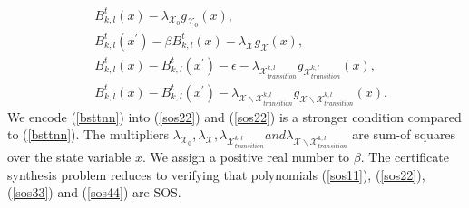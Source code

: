 \documentclass[acmlarge]{acmart}
\begin{document}
\begin{align}
  &B^t_{k, l}(x) - \lambda_{\mathcal{X}_0} g_{\mathcal{X}_0}(x), \label{sos11} \\
  &B^t_{k, l}(x^{\prime}) - \beta B^t_{k, l}(x) - \lambda_{\mathcal{X}} g_{\mathcal{X}}(x), \label{sos22} \\
  &B^t_{k, l}(x) - B^t_{k, l}(x^{\prime}) - \epsilon - \lambda_{\mathcal{X}_{transition}^{k, l}} g_{\mathcal{X}_{transition}^{k, l}}(x), \label{sos33} \\
  &B^t_{k, l}(x) -  B^t_{k, l}(x^{\prime}) - \lambda_{\mathcal{X} \backslash \mathcal{X}_{transition}^{k, l}} g_{\mathcal{X} \backslash \mathcal{X}_{transition}^{k, l}}(x). \label{sos44}
\end{align}
We encode (\ref{bsttnn}) into (\ref{sos22}) and (\ref{sos22}) is a stronger condition compared to (\ref{bsttnn}). The multipliers $\lambda_{\mathcal{X}_0}, \lambda_{\mathcal{X}}, \lambda_{\mathcal{X}_{transition}^{k, l}} and \lambda_{\mathcal{X} \backslash \mathcal{X}_{transition}^{k, l}}$ are sum-of squares over the state variable $x$.  We assign a positive real number to $\beta$. The certificate synthesis problem reduces to verifying that polynomials (\ref{sos11}), (\ref{sos22}), (\ref{sos33}) and (\ref{sos44}) are SOS.
\end{document}
